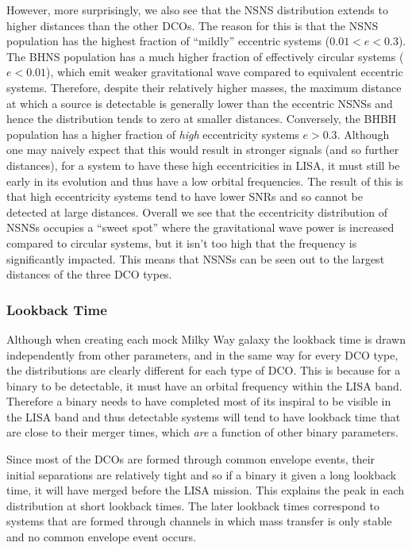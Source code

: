 However, more surprisingly, we also see that the NSNS distribution extends to higher distances than the other DCOs. The reason for this is that the NSNS population has the highest fraction of ``mildly'' eccentric systems ($0.01 < e < 0.3$). The BHNS population has a much higher fraction of effectively circular systems ($e < 0.01$), which emit weaker gravitational wave compared to equivalent eccentric systems. Therefore, despite their relatively higher masses, the maximum distance at which a source is detectable is generally lower than the eccentric NSNSs and hence the distribution tends to zero at smaller distances. Conversely, the BHBH population has a higher fraction of \textit{high} eccentricity systems $e > 0.3$. Although one may naively expect that this would result in stronger signals (and so further distances), for a system to have these high eccentricities in LISA, it must still be early in its evolution and thus have a low orbital frequencies. The result of this is that high eccentricity systems tend to have lower SNRs and so cannot be detected at large distances. Overall we see that the eccentricity distribution of NSNSs occupies a ``sweet spot'' where the gravitational wave power is increased compared to circular systems, but it isn't too high that the frequency is significantly impacted. This means that NSNSs can be seen out to the largest distances of the three DCO types.

\subsubsection{Lookback Time}
Although when creating each mock Milky Way galaxy the lookback time is drawn independently from other parameters, and in the same way for every DCO type, the distributions are clearly different for each type of DCO. This is because for a binary to be detectable, it must have an orbital frequency within the LISA band. Therefore a binary needs to have completed most of its inspiral to be visible in the LISA band and thus detectable systems will tend to have lookback time that are close to their merger times, which \textit{are} a function of other binary parameters.

Since most of the DCOs are formed through common envelope events, their initial separations are relatively tight and so if a binary it given a long lookback time, it will have merged before the LISA mission. This explains the peak in each distribution at short lookback times. The later lookback times correspond to systems that are formed through channels in which mass transfer is only stable and no common envelope event occurs.

